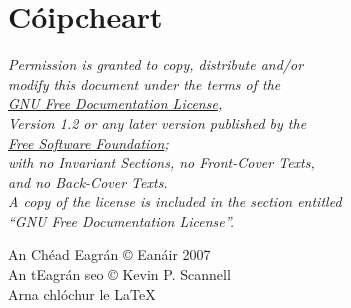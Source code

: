 

\newpage
\chapter*{C\'oipcheart} 

\begin{center}
\textit{Permission is granted to copy, distribute and/or \\
modify this document under the terms of the \\
\href{http://www.gnu.org/copyleft/fdl.html}{GNU Free Documentation License}, \\
Version 1.2 or any later version published by the \\
\href{http://www.gnu.org/fsf/fsf.html}{Free Software Foundation}; \\
with no Invariant Sections, no Front-Cover Texts, \\
and no Back-Cover Texts. \\
A copy of the license is included in the section entitled \\
``GNU Free Documentation License''.}
\vspace{7ex}

An Ch\'ead Eagr\'an \copyright \hspace{0.6ex} Ean\'air 2007 \\
\vspace{1ex}
An tEagr\'an seo 
\copyright \hspace{0.6ex} Kevin P. Scannell \the\year \\
\vspace{20ex}
{\small Arna chl\'ochur le \LaTeX}
\end{center}



\newpage
